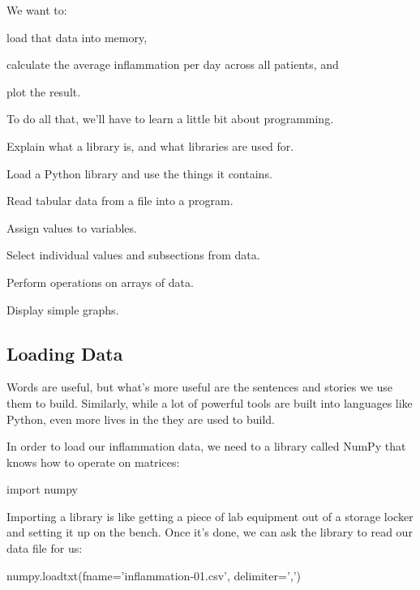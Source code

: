We want to:

\begin{swcitemize}
\item
  load that data into memory,
\item
  calculate the average inflammation per day across all patients, and
\item
  plot the result.
\end{swcitemize}

To do all that, we'll have to learn a little bit about programming.

\begin{objectives}
\begin{swcitemize}
\item
  Explain what a library is, and what libraries are used for.
\item
  Load a Python library and use the things it contains.
\item
  Read tabular data from a file into a program.
\item
  Assign values to variables.
\item
  Select individual values and subsections from data.
\item
  Perform operations on arrays of data.
\item
  Display simple graphs.
\end{swcitemize}
\end{objectives}

\subsection{Loading Data}

Words are useful, but what's more useful are the sentences and stories
we use them to build. Similarly, while a lot of powerful tools are built
into languages like Python, even more lives in the
 they are used to build.

In order to load our inflammation data, we need to
 a library called NumPy that knows how to
operate on matrices:

\begin{VerbIn}
import numpy
\end{VerbIn}

Importing a library is like getting a piece of lab equipment out of a
storage locker and setting it up on the bench. Once it's done, we can
ask the library to read our data file for us:

\begin{VerbIn}
numpy.loadtxt(fname='inflammation-01.csv', delimiter=',')
\end{VerbIn}

